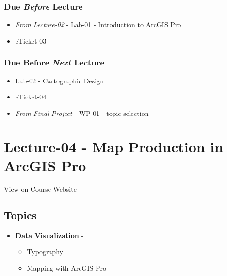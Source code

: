 \documentclass[
]{book}
\providecommand{\tightlist}{%
  \setlength{\itemsep}{0pt}\setlength{\parskip}{0pt}}
\begin{document}
\hypertarget{due-before-lecture-2}{%
\subsubsection*{\texorpdfstring{Due \emph{Before} Lecture}{Due Before Lecture}}\label{due-before-lecture-2}}

\begin{itemize}
\tightlist
\item
  \emph{From Lecture-02} - Lab-01 - Introduction to ArcGIS Pro
\item
  eTicket-03
\end{itemize}

\hypertarget{due-before-next-lecture-1}{%
\subsubsection*{\texorpdfstring{Due Before \emph{Next} Lecture}{Due Before Next Lecture}}\label{due-before-next-lecture-1}}

\begin{itemize}
\tightlist
\item
  Lab-02 - Cartographic Design
\item
  eTicket-04
\item
  \emph{From Final Project} - WP-01 - topic selection
\end{itemize}

\hypertarget{lecture-04---map-production-in-arcgis-pro}{%
\section*{Lecture-04 - Map Production in ArcGIS Pro}\label{lecture-04---map-production-in-arcgis-pro}}

View on Course Website

\hypertarget{topics-4}{%
\subsection*{Topics}\label{topics-4}}

\begin{itemize}
\tightlist
\item
  \textbf{Data Visualization} -

  \begin{itemize}
  \tightlist
  \item
    Typography
  \item
    Mapping with ArcGIS Pro
  \end{itemize}
\end{itemize}
\end{document}
